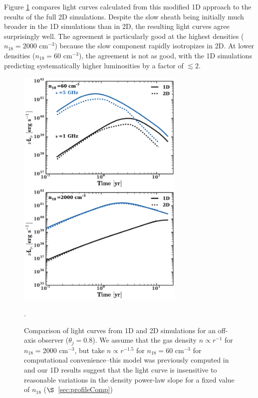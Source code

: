 \documentclass[usenatbib,fleqn]{mnras}
\begin{document}
Figure \ref{fig:1D2DB} compares light curves calculated from this
modified 1D approach to the results of the full 2D simulations.
Despite the slow sheath being initially much broader in the 1D
simulations than in 2D, the resulting light curves agree surprisingly
well.  The agreement is particularly good at the highest densities
($n_{18}=2000$ cm$^{-3}$) because the slow component rapidly
isotropizes in 2D.  At lower densities ($n_{18}=60$ cm$^{-3}$), the agreement is not
as good, with the 1D simulations predicting systematically higher
luminosities by a factor of $\lesssim 2$.



\begin{figure}
\includegraphics[width=8cm]{1d_2d.pdf}
\caption{\label{fig:1D2DB} Comparison of light curves from 1D and 2D
  simulations for an off-axis observer ($\theta_{j} = 0.8$). We
  assume that the gas density $n\propto r^{-1}$ for $n_{18}=2000$
  cm$^{-3}$, but take $n\propto r^{-1.5}$ for $n_{18}=60$ cm$^{-3}$
  for computational convenience--this model was previously computed in
  \citet{Mimica+2015} and our 1D results suggest that the light curve
  is insensitive to reasonable variations in the density power-law
  slope for a fixed value of $n_{18}$ ($\S$~\ref{sec:profileComp})}.
\end{figure}
\end{document}
